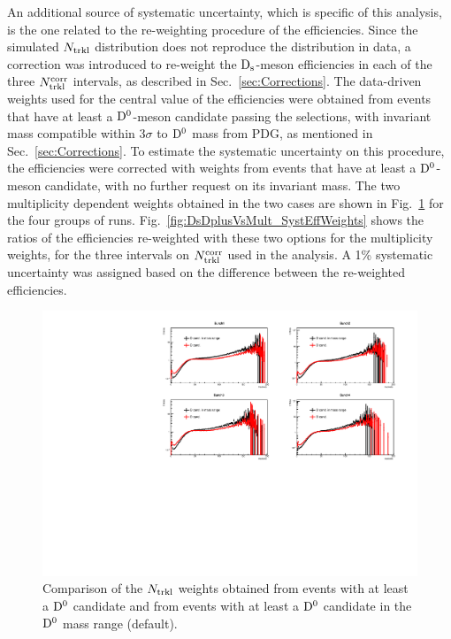 An additional source of systematic uncertainty, which is specific of this analysis, is the one related to 
the re-weighting procedure of the efficiencies.  
Since the simulated $N_{\rm trkl}$ distribution does not reproduce the distribution in data, 
a correction was introduced to re-weight the ${\rm D_s}$-meson efficiencies in each of the three $N_{\rm trkl}^{\rm corr}$ intervals, as described 
in Sec.~\ref{sec:Corrections}. 
The data-driven weights used for the central value of the efficiencies were obtained from
events that have at least a ${\rm D^0}$-meson candidate
passing the selections, with invariant mass compatible within 3$\sigma$ to ${\rm D^0}$ mass from PDG, as mentioned 
in Sec.~\ref{sec:Corrections}.
To estimate the systematic uncertainty on this procedure,
the efficiencies were corrected with weights from events that have at 
least a ${\rm D^0}$-meson candidate, with no further request on its invariant mass. 
The two multiplicity dependent weights obtained in the two cases are shown in 
Fig.~\ref{fig:NtrklWeights_EvWithD_EvWithCand_Comparison} for the four groups of runs. 
Fig.~\ref{fig:DsDplusVsMult_SystEffWeights} shows the ratios of the efficiencies re-weighted 
with these two options for the multiplicity weights, for the three intervals on $N_{\rm trkl}^{\rm corr}$ used
in the analysis. A 1\% systematic uncertainty was assigned based on the difference between 
the re-weighted efficiencies.\\

\begin{figure}[htpb]
\centering
 \includegraphics[width=.9\textwidth]{FigCap6/NtrkWeightsD-Cand_4Bunches_DsDplusVsmult.pdf}
 \caption{Comparison of the $N_{\rm trkl}$ weights obtained from events with at least a ${\rm D^0}$ candidate and from events with at least a ${\rm D^0}$ candidate in the ${\rm D^0}$ mass range (default).}
 \label{fig:NtrklWeights_EvWithD_EvWithCand_Comparison}
\end{figure}


